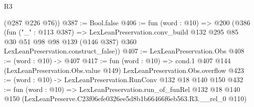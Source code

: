 \begin{lexlean}{R3}
\begin{coremodule}
      (@287 @226 @76))
@387 := Bool.false
@406 := fun (word : @10) =>
  @200
    (@386
      (fun ("_" : @113 @387) =>
      LexLeanPreservation.conv_build
        @132
        @295
        @85
        @30
        @51
        @98
        @98
        @139
        (@146 @387)
        @360
        LexLeanPreservation.construct_false))
@407 := LexLeanPreservation.Obs
@408 := (word : @10) -> @407
@417 := fun (word : @10) =>
  cond.{1} @407 @144 (LexLeanPreservation.Obs.value @149) LexLeanPreservation.Obs.overflow
@423 := (word : @10) -> LexLeanPreservation.RunConv @132 @18 @140 @150
@432 := fun (word : @10) =>
  LexLeanPreservation.run_of_funRel
    @132
    @18
    @140
    @150
    (LexLeanPreserve.C23f06efe0326ee5d8b1b66466f6eb563.R3.__rel_0 @110)
\end{coremodule}
\end{lexlean}
